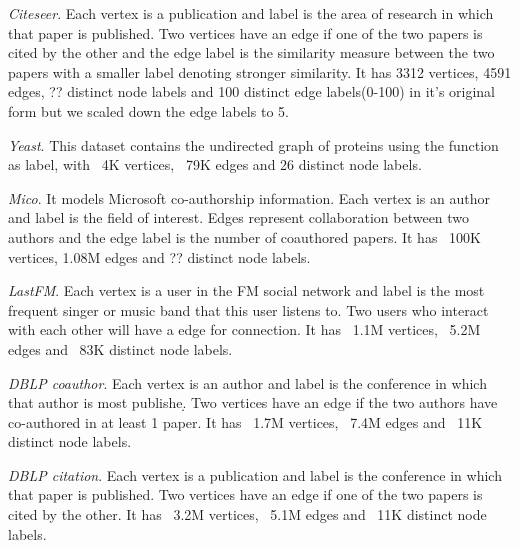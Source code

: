\par{\textit{Citeseer}}. Each vertex is a publication and label is the area of research in which that paper is published. Two vertices have an edge if one of the two papers is cited by the other and the edge label is the similarity measure between the two papers with a smaller label denoting stronger similarity. It has 3312 vertices, 4591 edges, ?? distinct node labels and 100 distinct edge labels(0-100) in it's original form but we scaled down the edge labels to 5. 

\par{\textit{Yeast}}. This dataset contains the undirected graph of proteins using the function as label, with ~4K vertices, ~79K edges and 26 distinct node labels. 

\par{\textit{Mico}}. It models Microsoft co-authorship information. Each vertex is an author and label is the field of interest. Edges represent collaboration between two authors and the edge label is the number of coauthored papers. It has ~100K vertices, 1.08M edges and ?? distinct node labels.

\par{\textit{LastFM}}. Each vertex is a user in the FM social network and label is the most frequent singer or music band that this user listens to. Two users who interact with each other will have a edge for connection. It has ~1.1M vertices, ~5.2M edges and ~83K distinct node labels.

\par{\textit{DBLP coauthor}}. Each vertex is an author and label is the conference in which that author is most publishe\d. Two vertices have an edge if the two authors have co-authored in at least 1 paper. It has ~1.7M vertices, ~7.4M edges and ~11K distinct node labels.

\par{\textit{DBLP citation}}. Each vertex is a publication and label is the conference in which that paper is published. Two vertices have an edge if one of the two papers is cited by the other. It has ~3.2M vertices, ~5.1M edges and ~11K distinct node labels.










